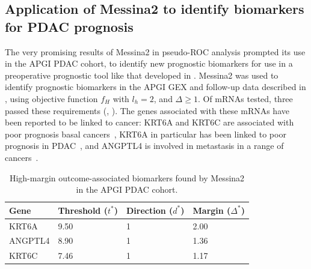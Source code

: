\documentclass[dissertation.tex]{subfiles}
\begin{document}
\subsection[Messina2 identifies candidate \texorpdfstring{\acrshort{PDAC}}{PDAC} biomarkers]{Application of Messina2 to identify biomarkers for \texorpdfstring{\acrshort{PDAC}}{PDAC} prognosis}
The very promising results of Messina2 in pseudo-ROC analysis prompted its use in the \gls{APGI} \gls{PDAC} cohort, to identify new prognostic biomarkers for use in a preoperative prognostic tool like that developed in .  Messina2 was used to identify prognostic biomarkers in the \gls{APGI} \gls{GEX} and follow-up data described in , using objective function $f_H$ with $l_h = 2$, and $\Delta \geq 1$.  Of  mRNAs tested, three passed these requirements (, ).  The genes associated with these mRNAs have been reported to be linked to cancer: KRT6A and KRT6C are associated with poor prognosis basal cancers~\cite{Choi2014,Livasy2006}, KRT6A in particular has been linked to poor prognosis in \gls{PDAC}~\cite{VandenBroeck2012}, and ANGPTL4 is involved in metastasis in a range of cancers~\cite{Adhikary2013,Kim2011b,Padua2008,Xiao2012}.

\begin{table}[!htb]
\centering
\caption[Outcome-associated biomarkers found by Messina2 in the \texorpdfstring{\acrshort{APGI}}{APGI} \texorpdfstring{\acrshort{PDAC}}{PDAC} cohort]{High-margin outcome-associated biomarkers found by Messina2 in the \acrshort{APGI} \acrshort{PDAC} cohort.}
\label{tab:mess-apgi-leads}
\begin{tabular}{@{}llll@{}}
\toprule
Gene    & Threshold ($t^*$) & Direction ($d^*$) & Margin ($\Delta^*$) \\ \midrule
KRT6A   & 9.50              & 1                 & 2.00                \\
ANGPTL4 & 8.90              & 1                 & 1.36                \\
KRT6C   & 7.46              & 1                 & 1.17                \\
\bottomrule
\end{tabular}
\end{table}
\end{document}
